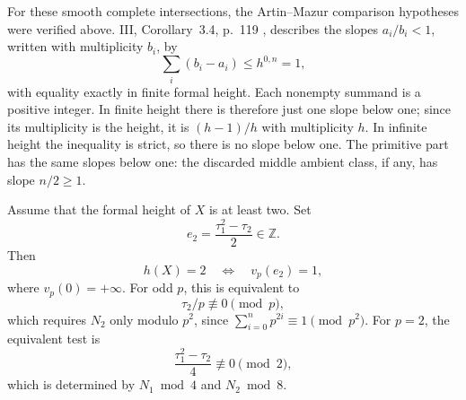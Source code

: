 For these smooth complete intersections, the Artin--Mazur comparison
hypotheses were verified above. III, Corollary~3.4, p.~119
\citep{AM}, describes the slopes $a_i/b_i<1$, written
with multiplicity $b_i$, by
\[
 \sum_i(b_i-a_i)\le h^{0,n}=1,
\]
with equality exactly in finite formal height.
Each nonempty summand is a positive integer. In finite height there
is therefore just one slope below one; since its multiplicity is the
height, it is $(h-1)/h$ with multiplicity $h$.
In infinite height the inequality is strict, so there is no slope
below one. The primitive part has the same slopes below one: the
discarded middle ambient class, if any, has slope $n/2\ge1$.

\begin{theorem}
\label{thm:height-two-point-counts}
Assume that the formal height of $X$ is at least two.
Set
\[
 e_2=\frac{\tau_1^2-\tau_2}{2}\in\mathbb Z.
\]
Then
\begin{equation}
 h(X)=2\quad\Longleftrightarrow\quad v_p(e_2)=1,       \label{eq:PC2}
\end{equation}
where $v_p(0)=+\infty$.
For odd $p$, this is equivalent to
\begin{equation}
 \tau_2/p\not\equiv0\pmod p,                         \label{eq:PC3}
\end{equation}
which requires $N_2$ only modulo $p^2$, since
$\sum_{i=0}^{n}p^{2i}\equiv1\pmod{p^2}$.
For $p=2$, the equivalent test is
\begin{equation}
 \frac{\tau_1^2-\tau_2}{4}\not\equiv0\pmod2,          \label{eq:PC4}
\end{equation}
which is determined by $N_1\bmod4$ and $N_2\bmod8$.
\end{theorem}
